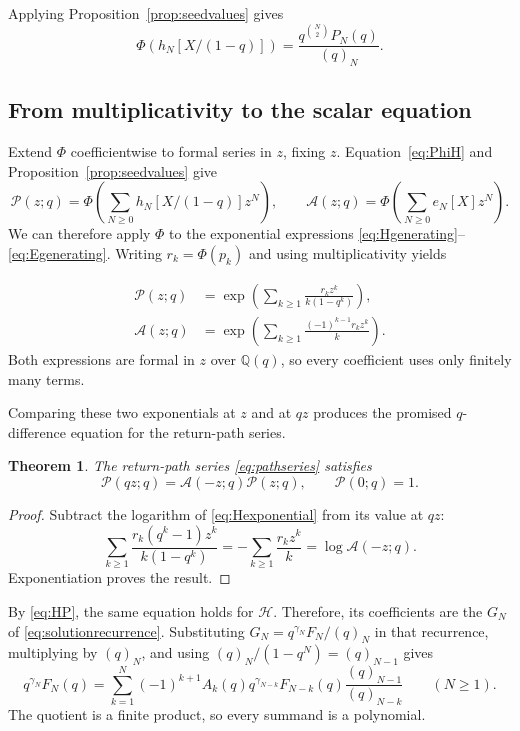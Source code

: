 \documentclass[12pt,reqno]{amsart}
\numberwithin{equation}{section}
\newtheorem{theorem}{Theorem}[section]
\theoremstyle{definition}
\theoremstyle{remark}
\theoremstyle{plain}
\newcommand{\QQ}{\mathbb Q}
\newcommand{\Hseries}{\mathscr H}
\newcommand{\Aseries}{\mathscr A}
\newcommand{\Pseries}{\mathscr P}
\begin{document}
Applying Proposition~\ref{prop:seedvalues} gives
\begin{equation}\label{eq:PhiH}
 \Phi(h_N[X/(1-q)])=\frac{q^{\binom N2}P_N(q)}{(q)_N}.
\end{equation}
\subsection{From multiplicativity to the scalar equation}
Extend $\Phi$ coefficientwise to formal series in $z$, fixing $z$.
Equation~\eqref{eq:PhiH} and Proposition~\ref{prop:seedvalues} give
\begin{equation}\label{eq:PhiSeries}
 \Pseries(z;q)=\Phi\!\left(\sum_{N\ge0}h_N[X/(1-q)]z^N\right),
 \qquad
 \Aseries(z;q)=\Phi\!\left(\sum_{N\ge0}e_N[X]z^N\right).
\end{equation}
We can therefore apply $\Phi$ to the exponential expressions
\eqref{eq:Hgenerating}--\eqref{eq:Egenerating}.
Writing $r_k=\Phi(p_k)$ and using multiplicativity yields

\begin{align}
 \Pseries(z;q)&=\exp\left(\sum_{k\ge1}\frac{r_k z^k}{k(1-q^k)}\right),\label{eq:Hexponential}\\
 \Aseries(z;q)&=\exp\left(\sum_{k\ge1}\frac{(-1)^{k-1}r_k z^k}{k}\right).
 \label{eq:Aexponential}
\end{align}
Both expressions are formal in $z$ over $\QQ(q)$, so every coefficient uses only finitely many terms.

Comparing these two exponentials at $z$ and at $qz$ produces the promised $q$-difference equation for the return-path series.
\begin{theorem}\label{thm:Euler}
The return-path series \eqref{eq:pathseries} satisfies
\begin{equation}\label{eq:HEuler}
 \Pseries(qz;q)=\Aseries(-z;q)\Pseries(z;q),\qquad\Pseries(0;q)=1.
\end{equation}
\end{theorem}
\begin{proof}
Subtract the logarithm of \eqref{eq:Hexponential} from its value at $qz$:
\[
 \sum_{k\ge1}\frac{r_k(q^k-1)z^k}{k(1-q^k)}
 =-\sum_{k\ge1}\frac{r_kz^k}{k}
 =\log\Aseries(-z;q).
\]
Exponentiation proves the result.
\end{proof}

By \eqref{eq:HP}, the same equation holds for $\Hseries$.
Therefore, its coefficients are the $G_N$ of \eqref{eq:solutionrecurrence}.
Substituting $G_N=q^{\gamma_N}F_N/(q)_N$ in that recurrence,
multiplying by $(q)_N$, and using $(q)_N/(1-q^N)=(q)_{N-1}$ gives
\begin{equation}\label{eq:finiteEuler}
 q^{\gamma_N}F_N(q)=\sum_{k=1}^N(-1)^{k+1}A_k(q)
       q^{\gamma_{N-k}}F_{N-k}(q)\frac{(q)_{N-1}}{(q)_{N-k}}
 \qquad(N\ge1).
\end{equation}
The quotient is a finite product, so every summand is a polynomial.
\end{document}
